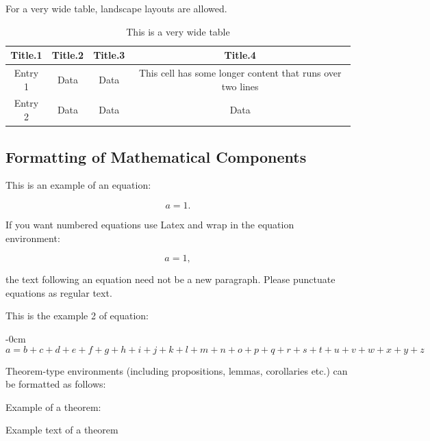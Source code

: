 \documentclass[notspecified,article,submit,moreauthors,pdftex]{Definitions/mdpi}
\begin{document}
For a very wide table, landscape layouts are allowed.

\startlandscape

\begin{table}[H]

\caption{\label{tab:tab2}This is a very wide table}
\begin{tabular}[t]{cccc}
\toprule
Title.1 & Title.2 & Title.3 & Title.4\\
\midrule
Entry 1 & Data & Data & This cell has some longer content that runs over
                               two lines\\
Entry 2 & Data & Data & Data\\
\bottomrule
\end{tabular}
\end{table}

\finishlandscape

\subsection{Formatting of Mathematical
Components}\label{formatting-of-mathematical-components}

This is an example of an equation:

\[
a = 1.
\]

If you want numbered equations use Latex and wrap in the equation
environment:

\begin{equation}
a = 1,
\end{equation}

the text following an equation need not be a new paragraph. Please
punctuate equations as regular text.

This is the example 2 of equation:

\begin{adjustwidth}{-\extralength}{0cm}
\begin{equation}
a = b + c + d + e + f + g + h + i + j + k + l + m + n + o + p + q + r + s + t + 
u + v + w + x + y + z
\end{equation}
\end{adjustwidth}

Theorem-type environments (including propositions, lemmas, corollaries
etc.) can be formatted as follows:

Example of a theorem:

\begin{Theorem}
Example text of a theorem

\end{Theorem}
\end{document}
